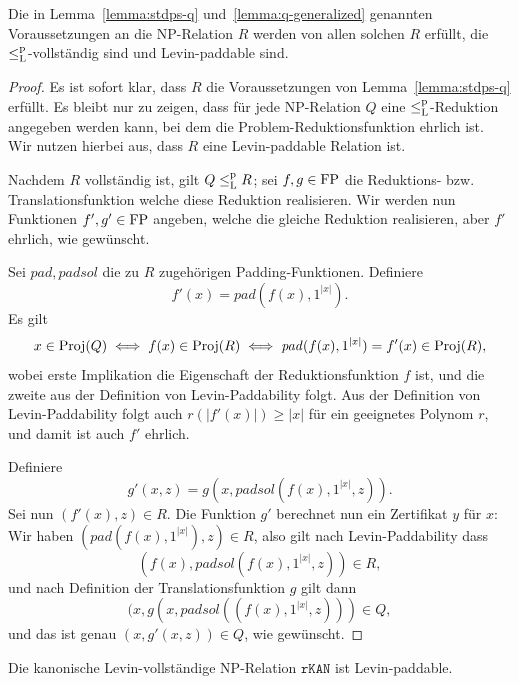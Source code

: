 \begin{lemma}
    Die in Lemma~\ref{lemma:stdps-q} und~\ref{lemma:q-generalized} genannten Voraussetzungen an die NP-Relation $R$ werden von allen solchen $R$ erfüllt, die $\leq_\mathrm{L}^\mathrm{p}$-vollständig sind und Levin-paddable sind.
\end{lemma}
\begin{proof}
    Es ist sofort klar, dass $R$ die Voraussetzungen von Lemma~\ref{lemma:stdps-q} erfüllt.
    Es bleibt nur zu zeigen, dass für jede NP-Relation $Q$ eine $\leq_\mathrm{L}^\mathrm{p}$-Reduktion angegeben werden kann, bei dem die Problem-Reduktionsfunktion ehrlich ist.
    Wir nutzen hierbei aus, dass $R$ eine Levin-paddable Relation ist.

    Nachdem $R$ vollständig ist, gilt $Q\leq_\mathrm{L}^\mathrm{p} R$; sei $f,g\in\mathrm{FP}$ die Reduktions- bzw. Translationsfunktion welche diese Reduktion realisieren. Wir werden nun Funktionen $f', g'\in\mathrm{FP}$ angeben, welche die gleiche Reduktion realisieren, aber $f'$ ehrlich, wie gewünscht.

    Sei $\mathit{pad}, \mathit{padsol}$ die zu $R$ zugehörigen Padding-Funktionen. Definiere
    \[ f'(x) = \mathit{pad}(f(x), 1^{|x|}). \]
    Es gilt
    \[ x\in\operatorname{Proj}(Q) \iff f(x)\in \operatorname{Proj}(R) \iff \mathit{pad}(f(x), 1^{|x|})=f'(x)\in\operatorname{Proj}(R), \]
    wobei erste Implikation die Eigenschaft der Reduktionsfunktion $f$ ist, und die zweite aus der Definition von Levin-Paddability folgt.
    Aus der Definition von  Levin-Paddability folgt auch $r(|f'(x)|)\geq |x|$ für ein geeignetes Polynom $r$, und damit ist auch $f'$ ehrlich.

    Definiere
    \[ g'(x, z) = g(x, \mathit{padsol}(f(x), 1^{|x|}, z)). \]
    Sei nun $(f'(x), z)\in R$. Die Funktion $g'$ berechnet nun ein Zertifikat $y$ für $x$: Wir haben $(\mathit{pad}(f(x), 1^{|x|}), z)\in R$, also gilt nach Levin-Paddability dass \[(f(x), \mathit{padsol}(f(x), 1^{|x|}, z))\in R,\] 
    und nach Definition der Translationsfunktion $g$ gilt dann
    \[(x, g(x, \mathit{padsol}((f(x), 1^{|x|}, z)))\in Q,\]
    und das ist genau $(x, g'(x, z))\in Q$, wie gewünscht.
\end{proof}

\begin{observation}\label{obs:rkan-paddable}
    Die kanonische Levin-vollständige NP-Relation $\mathtt{rKAN}$ ist Levin-paddable.
\end{observation}

